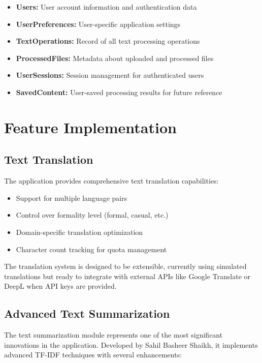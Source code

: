 \documentclass[12pt,a4paper]{article}
\begin{document}
\begin{itemize}
    \item \textbf{Users:} User account information and authentication data
    \item \textbf{UserPreferences:} User-specific application settings
    \item \textbf{TextOperations:} Record of all text processing operations
    \item \textbf{ProcessedFiles:} Metadata about uploaded and processed files
    \item \textbf{UserSessions:} Session management for authenticated users
    \item \textbf{SavedContent:} User-saved processing results for future reference
\end{itemize}

\section{Feature Implementation}

\subsection{Text Translation}

The application provides comprehensive text translation capabilities:

\begin{itemize}
    \item Support for multiple language pairs
    \item Control over formality level (formal, casual, etc.)
    \item Domain-specific translation optimization
    \item Character count tracking for quota management
\end{itemize}

The translation system is designed to be extensible, currently using simulated translations but ready to integrate with external APIs like Google Translate or DeepL when API keys are provided.

\subsection{Advanced Text Summarization}
\label{sec:summarization}

The text summarization module represents one of the most significant innovations in the application. Developed by Sahil Basheer Shaikh, it implements advanced TF-IDF techniques with several enhancements:
\end{document}
